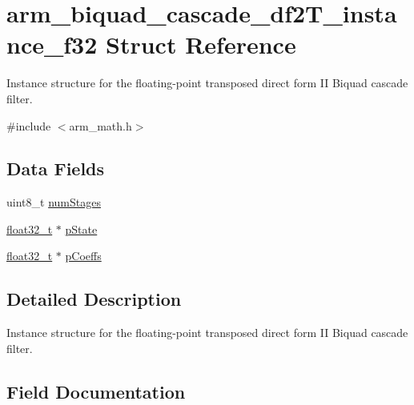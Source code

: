 \hypertarget{structarm__biquad__cascade__df2_t__instance__f32}{}\section{arm\+\_\+biquad\+\_\+cascade\+\_\+df2\+T\+\_\+instance\+\_\+f32 Struct Reference}
\label{structarm__biquad__cascade__df2_t__instance__f32}


Instance structure for the floating-\/point transposed direct form II Biquad cascade filter.  




{\ttfamily \#include $<$arm\+\_\+math.\+h$>$}

\subsection*{Data Fields}
\begin{DoxyCompactItemize}
\item 
uint8\+\_\+t \mbox{\hyperlink{structarm__biquad__cascade__df2_t__instance__f32_a3615af038f56917909e0370c11bc2ec7}{num\+Stages}}
\item 
\mbox{\hyperlink{arm__math_8h_a4611b605e45ab401f02cab15c5e38715}{float32\+\_\+t}} $\ast$ \mbox{\hyperlink{structarm__biquad__cascade__df2_t__instance__f32_a335c87e6fdc4b96601d95a5de8b9c463}{p\+State}}
\item 
\mbox{\hyperlink{arm__math_8h_a4611b605e45ab401f02cab15c5e38715}{float32\+\_\+t}} $\ast$ \mbox{\hyperlink{structarm__biquad__cascade__df2_t__instance__f32_aacbb8dd8eeba4b21fc2bb40076405ee3}{p\+Coeffs}}
\end{DoxyCompactItemize}


\subsection{Detailed Description}
Instance structure for the floating-\/point transposed direct form II Biquad cascade filter. 

\subsection{Field Documentation}
\mbox{\label{structarm__biquad__cascade__df2_t__instance__f32_a3615af038f56917909e0370c11bc2ec7}} 
